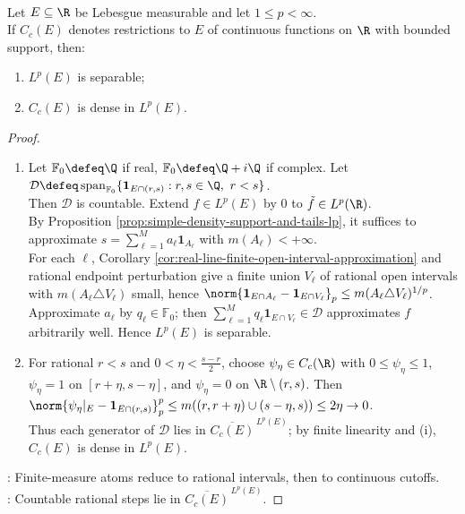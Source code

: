 \begin{theorem} \label{thm:lp-real-line-separability-and-cc-density} \\
Let $E\subseteq\R$ be Lebesgue measurable and let $1\leq p<\infty$.\\
If $C_c(E)$ denotes restrictions to $E$ of continuous functions on $\R$ with bounded support, then:
\begin{enumerate}[label=(\roman*)]
\setlength{\itemsep}{0pt}
\item $L^p(E)$ is separable;
\item $C_c(E)$ is dense in $L^p(E)$.
\end{enumerate}
\begin{proof}
\begin{enumerate}[label=(\roman*)]
\setlength{\itemsep}{0pt}
\item Let $\mathbb F_0\defeq\Q$ if real, $\mathbb F_0\defeq\Q+i\Q$ if complex. Let $\mathcal D\defeq\operatorname{span}_{\mathbb F_0}\{\mathbf{1}_{E\cap(r,s)}:r,s\in\Q,\ r<s\}$.\\
Then $\mathcal D$ is countable. Extend $f\in L^p(E)$ by $0$ to $\tilde f\in L^p(\R)$.\\
By Proposition \ref{prop:simple-density-support-and-tails-lp}, it suffices to approximate $s=\sum\limits_{\ell=1}^{M}a_\ell\mathbf{1}_{A_\ell}$ with $m(A_\ell)<+\infty$.\\
For each $\ell$, Corollary \ref{cor:real-line-finite-open-interval-approximation} and rational endpoint perturbation give a finite union $V_\ell$ of rational open intervals with $m(A_\ell\triangle V_\ell)$ small, hence $\norm{\mathbf{1}_{E\cap A_\ell}-\mathbf{1}_{E\cap V_\ell}}_p\leq m(A_\ell\triangle V_\ell)^{1/p}$. Approximate $a_\ell$ by $q_\ell\in\mathbb F_0$; then $\sum\limits_{\ell=1}^{M}q_\ell\mathbf{1}_{E\cap V_\ell}\in\mathcal D$ approximates $f$ arbitrarily well. Hence $L^p(E)$ is separable.
\item For rational $r<s$ and $0<\eta<\frac{s-r}{2}$, choose $\psi_\eta\in C_c(\R)$ with $0\leq\psi_\eta\leq1$, $\psi_\eta=1$ on $[r+\eta,s-\eta]$, and $\psi_\eta=0$ on $\R\setminus(r,s)$. Then $\norm{\psi_\eta|_E-\mathbf{1}_{E\cap(r,s)}}_p^p\leq m((r,r+\eta)\cup(s-\eta,s))\leq2\eta\to0$.\\
Thus each generator of $\mathcal D$ lies in $\overline{C_c(E)}^{\,L^p(E)}$; by finite linearity and (i), $C_c(E)$ is dense in $L^p(E)$.
\end{enumerate}
: Finite-measure atoms reduce to rational intervals, then to continuous cutoffs.\\
: Countable rational steps lie in $\overline{C_c(E)}^{\,L^p(E)}$.
\end{proof}
\end{theorem}

